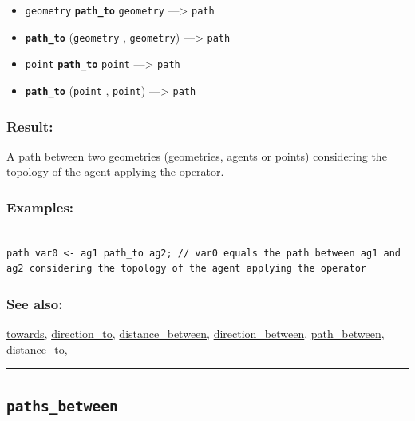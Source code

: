 \documentclass[]{book}
\providecommand{\tightlist}{%
  \setlength{\itemsep}{0pt}\setlength{\parskip}{0pt}}
\theoremstyle{definition}
\theoremstyle{definition}
\theoremstyle{definition}
\theoremstyle{remark}
\begin{document}
\begin{itemize}
\tightlist
\item
  \texttt{geometry} \textbf{\texttt{path\_to}} \texttt{geometry}
  ---\textgreater{} \texttt{path}
\item
  \textbf{\texttt{path\_to}} (\texttt{geometry} , \texttt{geometry})
  ---\textgreater{} \texttt{path}
\item
  \texttt{point} \textbf{\texttt{path\_to}} \texttt{point}
  ---\textgreater{} \texttt{path}
\item
  \textbf{\texttt{path\_to}} (\texttt{point} , \texttt{point})
  ---\textgreater{} \texttt{path}
\end{itemize}

\subsubsection{Result:}\label{result-382}

A path between two geometries (geometries, agents or points) considering
the topology of the agent applying the operator.

\subsubsection{Examples:}\label{examples-272}

\begin{verbatim}
 
path var0 <- ag1 path_to ag2; // var0 equals the path between ag1 and ag2 considering the topology of the agent applying the operator
\end{verbatim}

\subsubsection{See also:}\label{see-also-160}

\href{operators-s-to-z.html\#towards}{towards},
\href{operators-d-to-h.html\#direction_to}{direction\_to},
\href{operators-d-to-h.html\#distance_between}{distance\_between},
\href{operators-d-to-h.html\#direction_between}{direction\_between},
\href{operators-n-to-r.html\#path_between}{path\_between},
\href{operators-d-to-h.html\#distance_to}{distance\_to},

\begin{center}\rule{0.5\linewidth}{\linethickness}\end{center}

\subsection{\texorpdfstring{\texttt{paths\_between}}{paths\_between}}\label{paths_between}
\end{document}
